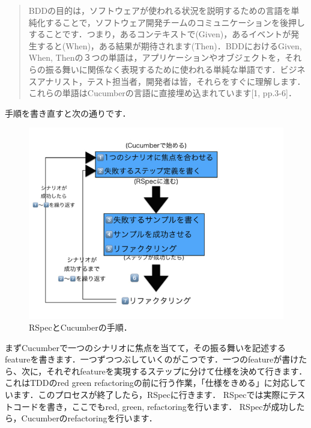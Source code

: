 \begin{quotation}
BDDの目的は，ソフトウェアが使われる状況を説明するための言語を単純化することで，ソフトウェア開発チームのコミュニケーションを後押しすることです．つまり，あるコンテキストで(Given)，あるイベントが発生すると(When)，ある結果が期待されます(Then)．BDDにおけるGiven, When, Thenの３つの単語は，アプリケーションやオブジェクトを，それらの振る舞いに関係なく表現するために使われる単純な単語です．ビジネスアナリスト，テスト担当者，開発者は皆，それらをすぐに理解します．これらの単語はCucumberの言語に直接埋め込まれています[1, pp.3-6]．

\end{quotation}
手順を書き直すと次の通りです．

\begin{figure}[htbp]\begin{center}
\includegraphics[width=12cm,bb= 0 0 937 753]{../figs/./my_help_nasu1.001.jpg}
\caption{RSpecとCucumberの手順．}
\label{default}\end{center}\end{figure}
まずCucumberで一つのシナリオに焦点を当てて，その振る舞いを記述するfeatureを書きます．一つずつつぶしていくのがこつです．一つのfeatureが書けたら、次に，それぞれfeatureを実現するステップに分けて仕様を決めて行きます．これはTDDのred green refactoringの前に行う作業，「仕様をきめる」に対応しています．このプロセスが終了したら，RSpecに行きます．
RSpecでは実際にテストコードを書き，ここでもred, green, refactoringを行います．
RSpecが成功したら，Cucumberのrefactoringを行います．

